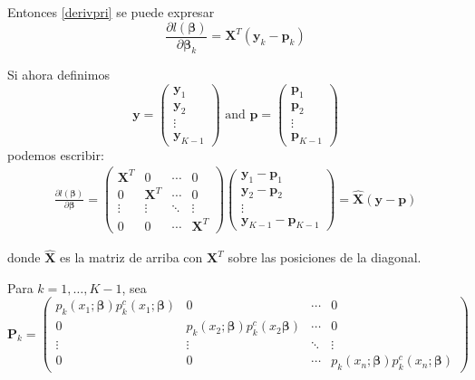 \documentclass{report}
\begin{document}
  
  Entonces  \eqref{derivpri} se puede expresar  
  $$
  \frac{\partial l( \boldsymbol{\beta})}{\partial  \boldsymbol{\beta}_k}=\mathbf{X}^T\left(\mathbf{y}_k-\mathbf{p}_k\right)
  $$
  
  
  Si ahora definimos 
  $$
  \mathbf{y}=\left(\begin{array}{c}
  	\mathbf{y}_1 \\
  	\mathbf{y}_2 \\
  	\vdots \\
  	\mathbf{y}_{K-1}
  \end{array}\right) \text { and } \mathbf{p}=\left(\begin{array}{c}
  	\mathbf{p}_1 \\
  	\mathbf{p}_2 \\
  	\vdots \\
  	\mathbf{p}_{K-1}
  \end{array}\right)
  $$
  podemos escribir:
  \begin{eqnarray}\label{Xhat}
  	\frac{\partial l( \boldsymbol{\beta})}{\partial  \boldsymbol{\beta}}=\left(\begin{array}{cccc}
  		\mathbf{X}^T & 0 & \cdots & 0 \\
  		0 & \mathbf{X}^T & \cdots & 0 \\
  		\vdots & \vdots & \ddots & \vdots \\
  		0 & 0 & \cdots & \mathbf{X}^T
  	\end{array}\right)\left(\begin{array}{c}
  		\mathbf{y}_1-\mathbf{p}_1 \\
  		\mathbf{y}_2-\mathbf{p}_2 \\
  		\vdots \\
  		\mathbf{y}_{K-1}-\mathbf{p}_{K-1}
  	\end{array}\right)=\hat{\boldsymbol{X}}(\mathbf{y}-\mathbf{p})
  \end{eqnarray}
  
  
  donde  $\hat{\boldsymbol{X}}$ es la matriz de arriba con $\mathbf{X}^T$ sobre las posiciones de la diagonal.
  
  
  Para $k=1, \ldots, K-1$, sea
  $$
  \mathbf{P}_k=\left(\begin{array}{cccc}
  	p_k\left(x_1 ;  \boldsymbol{\beta}\right) p_k^c\left(x_1 ;  \boldsymbol{\beta}\right) & 0 & \cdots & 0 \\
  	0 & p_k\left(x_2 ;  \boldsymbol{\beta}\right) p_k^c\left(x_2  \boldsymbol{\beta}\right) & \cdots & 0 \\
  	\vdots & \vdots & \ddots & \vdots \\
  	0 & 0 & \cdots & p_k\left(x_n ;  \boldsymbol{\beta}\right) p_k^c\left(x_n ;  \boldsymbol{\beta}\right)
  \end{array}\right)
  $$
  
\end{document}

